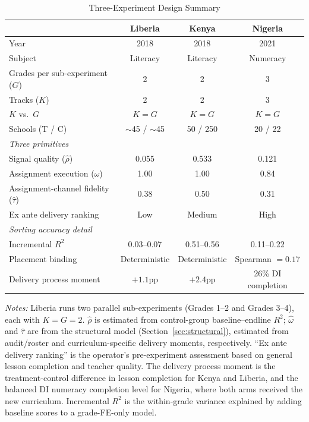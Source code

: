 \documentclass[11pt]{article}
\begin{document}
\begin{table}[H]
\centering
\caption{Three-Experiment Design Summary}
\label{tab:design_summary}
\begin{threeparttable}
\begin{tabular}[t]{lccc}
\toprule
 & Liberia & Kenya & Nigeria \\
\midrule
Year & 2018 & 2018 & 2021 \\
Subject & Literacy & Literacy & Numeracy \\
Grades per sub-experiment ($G$) & 2 & 2 & 3 \\
Tracks ($K$) & 2 & 2 & 3 \\
$K$ vs.\ $G$ & $K = G$ & $K = G$ & $K = G$ \\
Schools (T / C) & $\sim$45 / $\sim$45 & 50 / 250 & 20 / 22 \\
\midrule
\multicolumn{4}{l}{\textit{Three primitives}} \\
Signal quality ($\hat{\rho}$) & 0.055 & 0.533 & 0.121 \\
Assignment execution ($\hat{\omega}$) & 1.00 & 1.00 & 0.84 \\
Assignment-channel fidelity ($\hat{\tau}$) & 0.38 & 0.50 & 0.31 \\
Ex ante delivery ranking & Low & Medium & High \\
\midrule
\multicolumn{4}{l}{\textit{Sorting accuracy detail}} \\
Incremental $R^2$ & 0.03--0.07 & 0.51--0.56 & 0.11--0.22 \\
Placement binding & Deterministic & Deterministic & Spearman $= 0.17$ \\
	Delivery process moment & $+1.1$pp & $+2.4$pp & 26\% DI completion \\
\bottomrule
\end{tabular}
\begin{tablenotes}
\footnotesize
\item \textit{Notes:} Liberia runs two parallel sub-experiments (Grades 1--2 and Grades 3--4), each with $K = G = 2$. $\hat{\rho}$ is estimated from control-group baseline--endline $R^2$; $\hat{\omega}$ and $\hat{\tau}$ are from the structural model (Section~\ref{sec:structural}), estimated from audit/roster and curriculum-specific delivery moments, respectively. ``Ex ante delivery ranking'' is the operator's pre-experiment assessment based on general lesson completion and teacher quality. The delivery process moment is the treatment-control difference in lesson completion for Kenya and Liberia, and the balanced DI numeracy completion level for Nigeria, where both arms received the new curriculum. Incremental $R^2$ is the within-grade variance explained by adding baseline scores to a grade-FE-only model.
\end{tablenotes}
\end{threeparttable}
\end{table}
\end{document}
